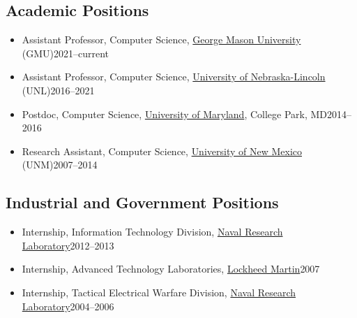 \documentclass[11pt]{article}
\begin{document}
    \subsection{Academic Positions}

    \begin{itemize}

      \item Assistant Professor, Computer Science, \href{https://cs.gmu.edu}{George Mason University} (GMU)\hfill 2021--current

      \item Assistant Professor, Computer Science, \href{https://computing.unl.edu}{University of Nebraska-Lincoln} (UNL)\hfill 2016--2021

      \item Postdoc, Computer Science,  \href{https://www.umd.edu}{University of Maryland}, College Park, MD\hfill 2014--2016

      \item Research Assistant, Computer Science, \href{https://www.cs.unm.edu}{University of New Mexico} (UNM)\hfill 2007--2014

    \end{itemize}

    \subsection{Industrial and Government Positions}
    \begin{itemize}
      \item Internship, Information Technology Division, \href{https://www.nrl.navy.mil}{Naval Research Laboratory}\hfill 2012--2013
      \item Internship, Advanced Technology Laboratories, \href{https://lockheedmartin.com/en-us/capabilities/research-labs/advanced-technology-labs.html}{Lockheed Martin}\hfill 2007
      \item Internship, Tactical Electrical Warfare Division,  \href{https://www.nrl.navy.mil}{Naval Research Laboratory}\hfill 2004--2006
    \end{itemize}
\end{document}

